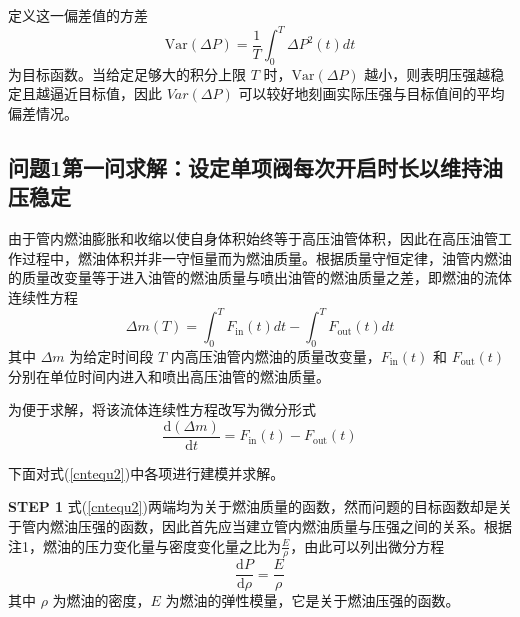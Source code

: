 \documentclass[12pt,a4paper]{article}
\begin{document}
定义这一偏差值的方差
\begin{equation}
\label{Var}
\text{Var}(\Delta P)=\frac{1}{T}\int_0^T\Delta P^2(t)dt
\end{equation}
为目标函数。当给定足够大的积分上限 $T$ 时，$\text{Var}(\Delta P)$ 越小，则表明压强越稳定且越逼近目标值，因此 $Var(\Delta P)$ 可以较好地刻画实际压强与目标值间的平均偏差情况。

\subsection{问题1第一问求解：设定单项阀每次开启时长以维持油压稳定}
由于管内燃油膨胀和收缩以使自身体积始终等于高压油管体积，因此在高压油管工作过程中，燃油体积并非一守恒量而为燃油质量。根据质量守恒定律，油管内燃油的质量改变量等于进入油管的燃油质量与喷出油管的燃油质量之差，即燃油的流体连续性方程
\begin{equation}
\label{cntequ}
\Delta m(T)=\int_0^TF_{\text{in}}(t)dt-\int_0^TF_{\text{out}}(t)dt
\end{equation}
其中 $\Delta m$ 为给定时间段 $T$ 内高压油管内燃油的质量改变量，$F_{\text{in}}(t)$ 和 $F_{\text{out}}(t)$ 分别在单位时间内进入和喷出高压油管的燃油质量。

为便于求解，将该流体连续性方程改写为微分形式
\begin{equation}
\label{cntequ2}
\frac{\text{d}(\Delta m)}{\text{d} t}=F_{\text{in}}(t)-F_{\text{out}}(t)
\end{equation}

下面对式(\ref{cntequ2})中各项进行建模并求解。

\textbf{\songti STEP 1} 式(\ref{cntequ2})两端均为关于燃油质量的函数，然而问题的目标函数却是关于管内燃油压强的函数，因此首先应当建立管内燃油质量与压强之间的关系。根据注1，燃油的压力变化量与密度变化量之比为$\frac{E}{\rho}$，由此可以列出微分方程
\begin{equation}
\label{P-rho}
\frac{\text{d}P}{\text{d}\rho}=\frac{E}{\rho}
\end{equation}
其中 $\rho$ 为燃油的密度，$E$ 为燃油的弹性模量，它是关于燃油压强的函数。
\end{document}
